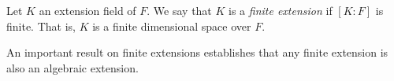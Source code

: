 \documentclass[12pt]{article}
\begin{document}
Let $K$ an extension field of $F$. We say that $K$ is a \emph{finite extension} if
$[K:F]$ is finite. That is, $K$ is a finite dimensional space over $F$.

An important result on finite extensions establishes that any finite extension is also an algebraic extension.
\end{document}
